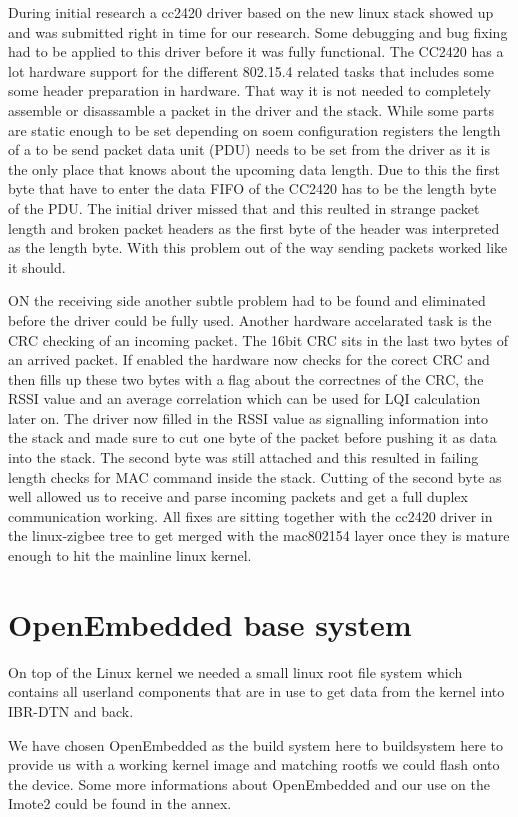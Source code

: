 During initial research a cc2420 driver based on the new linux stack showed up
and was submitted right in time for our research. Some debugging and bug fixing
had to be applied to this driver before it was fully functional. The CC2420 has
a lot hardware support for the different 802.15.4 related tasks that includes
some some header preparation in hardware. That way it is not needed to
completely assemble or disassamble a packet in the driver and the stack. While
some parts are static enough to be set depending on soem configuration registers
the length of a to be send packet data unit (PDU) needs to be set from the driver
as it is the only place that knows about the upcoming data length. Due to this
the first byte that have to enter the data FIFO of the CC2420 has to be the
length byte of the PDU. The initial driver missed that and this reulted in
strange packet length and broken packet headers as the first byte of the header
was interpreted as the length byte. With this problem out of the way sending
packets worked like it should.

ON the receiving side another subtle problem had to be found and eliminated
before the driver could be fully used. Another hardware accelarated task is the
CRC checking of an incoming packet. The 16bit CRC sits in the last two bytes of
an arrived packet. If enabled the hardware now checks for the corect CRC and
then fills up these two bytes with a flag about the correctnes of the CRC, the
RSSI value and an average correlation which can be used for LQI calculation
later on. The driver now filled in the RSSI value as signalling information into
the stack and made sure to cut one byte of the packet before pushing it as data
into the stack. The second byte was still attached and this resulted in failing
length checks for MAC command inside the stack. Cutting of the second byte as
well allowed us to receive and parse incoming packets and get a full duplex
communication working. All fixes are sitting together with the cc2420 driver
in the linux-zigbee tree to get merged with the mac802154 layer once they is
mature enough to hit the mainline linux kernel.

\section{OpenEmbedded base system}
On top of the Linux kernel we needed a small linux root file system which
contains all userland components that are in use to get data from the kernel
into IBR-DTN and back.

We have chosen OpenEmbedded as the build system here to buildsystem here to
provide us with a working kernel image and matching rootfs we could flash onto
the device. Some more informations about OpenEmbedded and our use on the Imote2
could be found in the annex.

